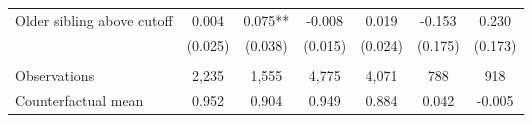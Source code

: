 {{\begin{tabular}{lcccccc}
Older sibling above cutoff&       0.004   &       0.075** &      -0.008   &       0.019   &      -0.153   &       0.230   \\
                    &     (0.025)   &     (0.038)   &     (0.015)   &     (0.024)   &     (0.175)   &     (0.173)   \\
                    &               &               &               &               &               &               \\
Observations        &       2,235   &       1,555   &       4,775   &       4,071   &         788   &         918   \\
Counterfactual mean &       0.952   &       0.904   &       0.949   &       0.884   &       0.042   &      -0.005   \\
 

\bottomrule
\end{tabular}
}
}
